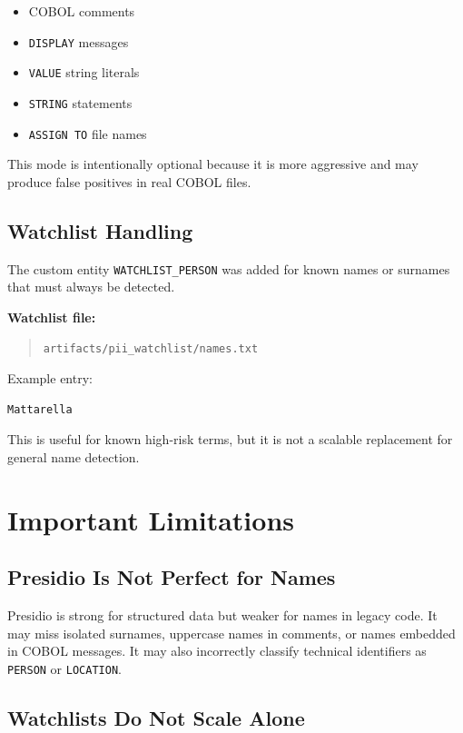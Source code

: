 ﻿\documentclass[11pt,a4paper]{article}
\newcommand{\code}[1]{\texttt{#1}}
\begin{document}
\begin{itemize}
  \item COBOL comments
  \item \code{DISPLAY} messages
  \item \code{VALUE} string literals
  \item \code{STRING} statements
  \item \code{ASSIGN TO} file names
\end{itemize}

This mode is intentionally optional because it is more aggressive and may produce false positives in real COBOL files.

\subsection{Watchlist Handling}

The custom entity \code{WATCHLIST\_PERSON} was added for known names or surnames that must always be detected.

\textbf{Watchlist file:}

\begin{quote}
\code{artifacts/pii\_watchlist/names.txt}
\end{quote}

Example entry:

\begin{verbatim}
Mattarella
\end{verbatim}

This is useful for known high-risk terms, but it is not a scalable replacement for general name detection.

\section{Important Limitations}

\subsection{Presidio Is Not Perfect for Names}

Presidio is strong for structured data but weaker for names in legacy code. It may miss isolated surnames, uppercase names in comments, or names embedded in COBOL messages. It may also incorrectly classify technical identifiers as \code{PERSON} or \code{LOCATION}.

\subsection{Watchlists Do Not Scale Alone}
\end{document}
